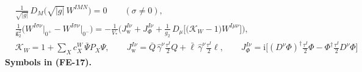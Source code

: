 \documentclass[
  10pt,
]{article}
\begin{document}
\[
\begin{aligned}
&\frac{1}{\sqrt{\lvert g\rvert}}\,D_M\big(\sqrt{\lvert g\rvert}\,W^{IMN}\big) = 0\qquad (\sigma \ne 0),\\
&\frac{1}{\mathsf{g}_2^2}\Big(W^{I\sigma\nu}\big\vert_{0^+} - W^{I\sigma\nu}\big\vert_{0^-}\Big)
 = -\frac{1}{V_*}\Big(J_{\mathrm{w}}^{I\nu} + J_\Phi^{I\nu} + \frac{1}{g_2}\,D_\mu\big[\big(\mathcal{K}_{W} - 1\big)W^{I\mu\nu}\big]\Big),\\
&\mathcal{K}_{W} = 1 + \sum_X c^{W}_X\,\bar\Psi P_X\Psi,\qquad J_{\mathrm{w}}^{I\nu} = \bar Q\,\hat\gamma^\nu\frac{\tau^I}{2}Q + \bar\ell\,\hat\gamma^\nu\frac{\tau^I}{2}\ell,\qquad
 J_\Phi^{I\nu} = \mathrm{i}\Big[(D^\nu\Phi)^\dagger\frac{\tau^I}{2}\Phi - \Phi^\dagger\frac{\tau^I}{2}D^\nu\Phi\Big]
\end{aligned} \tag{FE-17}
\] \textbf{Symbols in (FE-17).}
\end{document}

